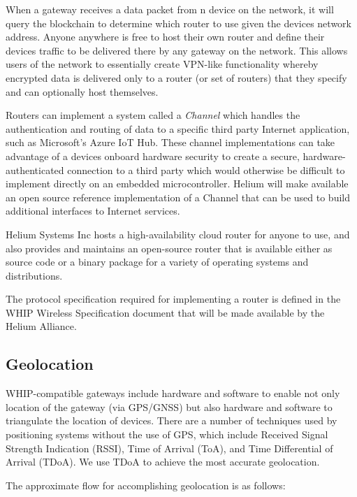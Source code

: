\documentclass[10pt, nonatbib, nocopyrightspace, reprint]{sigplanconf}
\begin{document}
When a gateway receives a data packet from n device on the network, it will query the blockchain to determine which router to use given the devices network address. Anyone anywhere is free to host their own router and define their devices traffic to be delivered there by any gateway on the network. This allows users of the network to essentially create VPN-like functionality whereby encrypted data is delivered only to a router (or set of routers) that they specify and can optionally host themselves.

Routers can implement a system called a \emph{Channel} which handles the authentication and routing of data to a specific third party Internet application, such as Microsoft's Azure IoT Hub. These channel implementations can take advantage of a devices onboard hardware security to create a secure, hardware-authenticated connection to a third party which would otherwise be difficult to implement directly on an embedded microcontroller. Helium will make available an open source reference implementation of a Channel that can be used to build additional interfaces to Internet services.

Helium Systems Inc hosts a high-availability cloud router for anyone to use, and also provides and maintains an open-source router that is available either as source code or a binary package for a variety of operating systems and distributions.

The protocol specification required for implementing a router is defined in the WHIP Wireless Specification document that will be made available by the Helium Alliance.

\subsection{Geolocation}\label{geolocation}

WHIP-compatible gateways include hardware and software to enable not only location of the gateway (via GPS/GNSS) but also hardware and software to triangulate the location of devices. There are a number of techniques used by positioning systems without the use of GPS, which include Received Signal Strength Indication (RSSI), Time of Arrival (ToA), and Time Differential of Arrival (TDoA). We use TDoA to achieve the most accurate geolocation.

The approximate flow for accomplishing geolocation is as follows:
\end{document}
